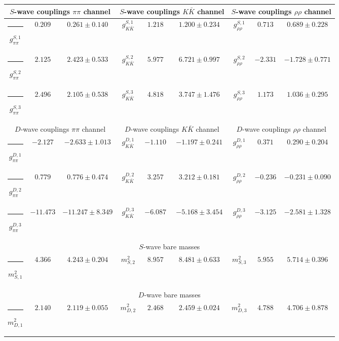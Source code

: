 \begin{table}[h]
\begin{ruledtabular}
\begin{tabular}{c c c c c c c c c}
\multicolumn{3}{c}{$S$-wave couplings $\pi \pi$ channel}  & \multicolumn{3}{c}{$S$-wave couplings $K  \bar K$ channel} & \multicolumn{3}{c}{$S$-wave couplings $\rho\rho$ channel} \\ \hline
\rule[-0.2cm]{-0.1cm}{.55cm} $g^{S,1}_{\pi\pi}$ & $0.209$ & $0.261 \pm 0.140$ & $g^{S,1}_{K\bar K}$ & $1.218$ & $1.200 \pm 0.234$ & $g^{S,1}_{\rho\rho}$ & $0.713$ & $0.689 \pm 0.228$ \\
\rule[-0.2cm]{-0.1cm}{.55cm} $g^{S,2}_{\pi\pi}$ & $2.125$ & $2.423 \pm 0.533$ & $g^{S,2}_{K\bar K}$ & $5.977$ & $6.721 \pm 0.997$ & $g^{S,2}_{\rho\rho}$ & $-2.331$ & $-1.728 \pm 0.771$ \\
\rule[-0.2cm]{-0.1cm}{.55cm} $g^{S,3}_{\pi\pi}$ & $2.496$ & $2.105 \pm 0.538$ & $g^{S,3}_{K\bar K}$ & $4.818$ & $3.747 \pm 1.476$ & $g^{S,3}_{\rho\rho}$ & $1.173$ & $1.036 \pm 0.295$ \\
\hline 
\multicolumn{3}{c}{$D$-wave couplings $\pi \pi$ channel}  & \multicolumn{3}{c}{$D$-wave couplings $K  \bar K$ channel} & \multicolumn{3}{c}{$D$-wave couplings $\rho\rho$ channel} \\ \hline
\rule[-0.2cm]{-0.1cm}{.55cm} $g^{D,1}_{\pi\pi}$ & $-2.127$ & $-2.633 \pm 1.013$ & $g^{D,1}_{K\bar K}$ & $-1.110$ & $-1.197 \pm 0.241$ & $g^{D,1}_{\rho\rho}$ & $0.371$ & $0.290 \pm 0.204$ \\
\rule[-0.2cm]{-0.1cm}{.55cm} $g^{D,2}_{\pi\pi}$ & $0.779$ & $0.776 \pm 0.474$ & $g^{D,2}_{K\bar K}$ & $3.257$ & $3.212 \pm 0.181$ & $g^{D,2}_{\rho\rho}$ & $-0.236$ & $-0.231 \pm 0.090$ \\
\rule[-0.2cm]{-0.1cm}{.55cm} $g^{D,3}_{\pi\pi}$ & $-11.473$ & $-11.247 \pm 8.349$ & $g^{D,3}_{K\bar K}$ & $-6.087$ & $-5.168 \pm 3.454$ & $g^{D,3}_{\rho\rho}$ & $-3.125$ & $-2.581 \pm 1.328$ \\
\hline 
\multicolumn{9}{c}{$S$-wave bare masses}   \\ \hline
\rule[-0.2cm]{-0.1cm}{.55cm} $m^2_{S,1}$ & $4.366$ & $4.243 \pm 0.204$ & $m^2_{S,2}$ & $8.957$ & $8.481 \pm 0.633$ & $m^2_{S,3}$ & $5.955$ & $5.714 \pm 0.396$ \\
\hline 
\multicolumn{9}{c}{$D$-wave bare masses}   \\ \hline
\rule[-0.2cm]{-0.1cm}{.55cm} $m^2_{D,1}$ & $2.140$ & $2.119 \pm 0.055$ & $m^2_{D,2}$ & $2.468$ & $2.459 \pm 0.024$ & $m^2_{D,3}$ & $4.788$ & $4.706 \pm 0.878$ \\

\end{tabular}
\end{ruledtabular}
\end{table}
